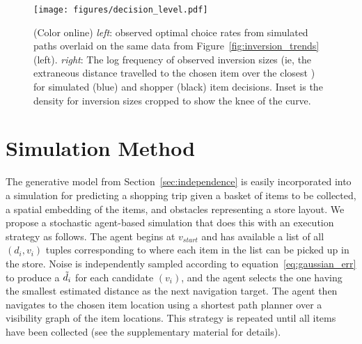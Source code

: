 \documentclass[aps,pre,twocolumn,groupedaddress]{revtex4-2}
\begin{document}
\begin{figure}
    \centering
    \texttt{[image: figures/decision\_level.pdf]}%
    \caption{(Color online)  \textit{left}: observed optimal choice rates from simulated paths overlaid on the same data from Figure~\ref{fig:inversion_trends} (left).
    \textit{right}: The log frequency of observed inversion sizes (ie, the extraneous distance travelled to the chosen item over the closest ) for simulated (blue) and shopper (black) item decisions. Inset is the density for inversion sizes cropped to show the knee of the curve.\label{fig:decision_level}}
\end{figure}

\section{Simulation Method\label{sec:simulation}}
The generative model from Section~\ref{sec:independence} is easily incorporated into a simulation for predicting a shopping trip given a basket of items to be collected, a spatial embedding of the items, and obstacles representing a store layout. We propose a stochastic agent-based simulation that does this with an execution strategy as follows. The agent begins at $v_{start}$ and has available a list of all $(d_{i},v_{i})$ tuples corresponding to where each item in the list can be picked up in the store. Noise is independently sampled according to equation~\ref{eq:gaussian_err} to produce a $\Tilde{d}_{i}$ for each candidate $(v_{i})$, and the agent selects the one having the smallest estimated distance as the next navigation target. The agent then navigates to the chosen item location using a shortest path planner over a visibility graph of the item locations. This strategy is repeated until all items have been collected (see the supplementary material for details).

\end{document}
